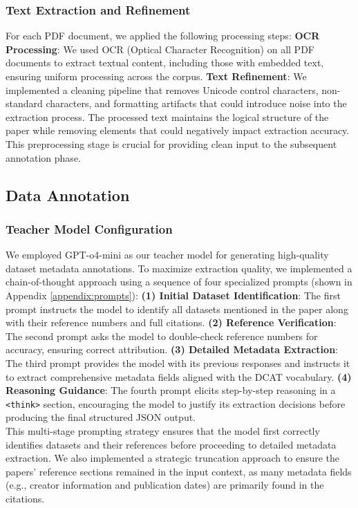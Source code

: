 \documentclass[runningheads]{llncs}
\begin{document}
\subsubsection{Text Extraction and Refinement}
For each PDF document, we applied the following processing steps:
    \textbf{OCR Processing}: We used OCR (Optical Character Recognition) on all PDF documents to extract textual content, including those with embedded text, ensuring uniform processing across the corpus.
     \textbf{Text Refinement}: We implemented a cleaning pipeline that removes Unicode control characters, non-standard characters, and formatting artifacts that could introduce noise into the extraction process.
\noindent
The processed text maintains the logical structure of the paper while removing elements that could negatively impact extraction accuracy. This preprocessing stage is crucial for providing clean input to the subsequent annotation phase.
\subsection{Data Annotation}
\subsubsection{Teacher Model Configuration}
We employed GPT-o4-mini as our teacher model for generating high-quality dataset metadata annotations. To maximize extraction quality, we implemented a chain-of-thought approach using a sequence of four specialized prompts (shown in Appendix \ref{appendix:prompts}):
     \textbf{(1) Initial Dataset Identification}: The first prompt instructs the model to identify all datasets mentioned in the paper along with their reference numbers and full citations.
    \textbf{(2) Reference Verification}: The second prompt asks the model to double-check reference numbers for accuracy, ensuring correct attribution.
    \textbf{(3) Detailed Metadata Extraction}: The third prompt provides the model with its previous responses and instructs it to extract comprehensive metadata fields aligned with the DCAT vocabulary.
   \textbf{(4) Reasoning Guidance}: The fourth prompt elicits step-by-step reasoning in a \texttt{<think>} section, encouraging the model to justify its extraction decisions before producing the final structured JSON output.
\\
\noindent
This multi-stage prompting strategy ensures that the model first correctly identifies datasets and their references before proceeding to detailed metadata extraction. We also implemented a strategic truncation approach to ensure the papers' reference sections remained in the input context, as many metadata fields (e.g., creator information and publication dates) are primarily found in the citations.
\end{document}
